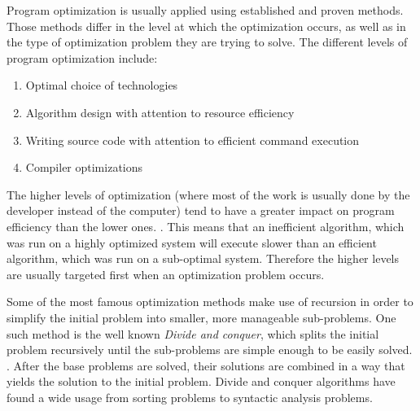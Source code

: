 \documentclass[a4paper]{report}
\begin{document}
Program optimization is usually applied using established and proven methods. Those methods differ in the level at which the optimization occurs, as well as in the type of optimization problem they are trying to solve. The different levels of program optimization include:
\begin{enumerate}
    \item Optimal choice of technologies
    \item Algorithm design with attention to resource efficiency
    \item Writing source code with attention to efficient command execution
    \item Compiler optimizations
\end{enumerate}

The higher levels of optimization (where most of the work is usually done by the developer instead of the computer) tend to have a greater impact on program efficiency than the lower ones. \citep{pottosin91}. This means that an inefficient algorithm, which was run on a highly optimized system will execute slower than an efficient algorithm, which was run on a sub-optimal system. Therefore the higher levels are usually targeted first when an optimization problem occurs.
    
Some of the most famous optimization methods make use of recursion in order to simplify the initial problem into smaller, more manageable sub-problems. One such method is the well known \textit{Divide and conquer}, which splits the initial problem recursively until the sub-problems are simple enough to be easily solved. \citep{smith85}. After the base problems are solved, their solutions are combined in a way that yields the solution to the initial problem. Divide and conquer algorithms have found a wide usage from sorting problems to syntactic analysis problems. \citep{algs_intro}
\end{document}
